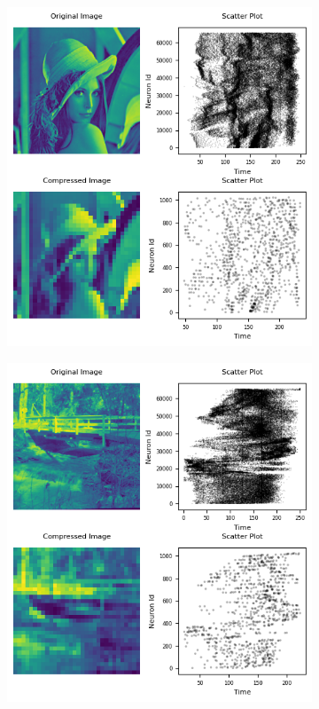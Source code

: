 \documentclass[12pt]{article}
\begin{document}
\begin{figure}[H]
\begin{subfigure}[b]{0.45\textwidth}
  \end{subfigure}
  \\[\smallskipamount]
  \begin{subfigure}[b]{0.45\textwidth}
    \includegraphics[width=\textwidth]{Figs/ttfs_lena.png}
  \end{subfigure}
  \hfill
  \begin{subfigure}[b]{0.45\textwidth}
    \includegraphics[width=\textwidth]{Figs/ttfs_bridge.png}

\end{subfigure}
\end{figure}
\end{document}
